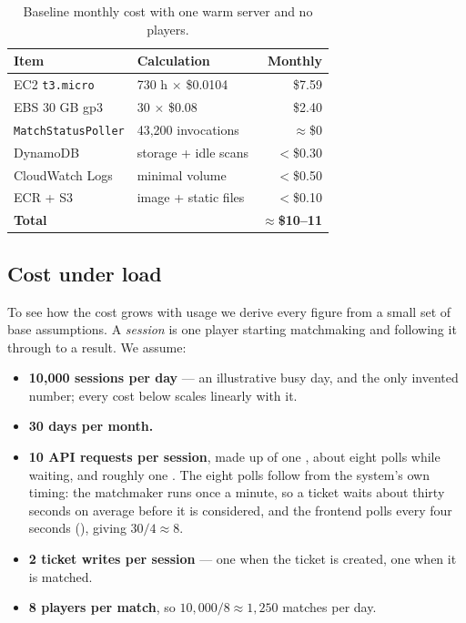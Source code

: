     \begin{table}[t]
        \centering
        \footnotesize
        \caption{Baseline monthly cost with one warm server and no players.}
        \label{tab:baseline}
        \begin{tabular}{p{2.3cm} p{3.0cm} r}
            \toprule
            \textbf{Item} & \textbf{Calculation} & \textbf{Monthly} \\
            \midrule
            EC2 \texttt{t3.micro} & 730 h $\times$ \$0.0104 & \$7.59 \\
            EBS 30 GB gp3 & 30 $\times$ \$0.08 & \$2.40 \\
            \texttt{MatchStatusPoller} & 43{,}200 invocations & $\approx$\$0 \\
            DynamoDB & storage + idle scans & $<$\$0.30 \\
            CloudWatch Logs & minimal volume & $<$\$0.50 \\
            ECR + S3 & image + static files & $<$\$0.10 \\
            \midrule
            \textbf{Total} & & \textbf{$\approx$\$10--11} \\
            \bottomrule
        \end{tabular}
    \end{table}

    \subsection{Cost under load}

    To see how the cost grows with usage we derive every figure from a small set of base assumptions. A \emph{session} is one player starting matchmaking and following it through to a result. We assume:

    \begin{itemize}
        \item \textbf{10{,}000 sessions per day} --- an illustrative busy day, and the only invented number; every cost below scales linearly with it.
        \item \textbf{30 days per month.}
        \item \textbf{10 API requests per session}, made up of one , about eight  polls while waiting, and roughly one . The eight polls follow from the system's own timing: the matchmaker runs once a minute, so a ticket waits about thirty seconds on average before it is considered, and the frontend polls every four seconds (), giving $30 / 4 \approx 8$.
        \item \textbf{2 ticket writes per session} --- one when the ticket is created, one when it is matched.
        \item \textbf{8 players per match}, so $10{,}000 / 8 \approx 1{,}250$ matches per day.
    \end{itemize}


